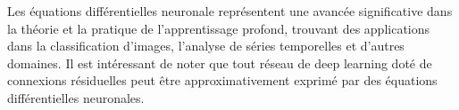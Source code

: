 \begin{enumerate}
    Les équations différentielles neuronale représentent une avancée significative dans la théorie et la pratique de l'apprentissage profond, trouvant des applications dans la classification d'images, l'analyse de séries temporelles et d'autres domaines. Il est intéressant de noter que tout réseau de deep learning doté de connexions résiduelles peut être approximativement exprimé par des équations différentielles neuronales.
\end{enumerate}